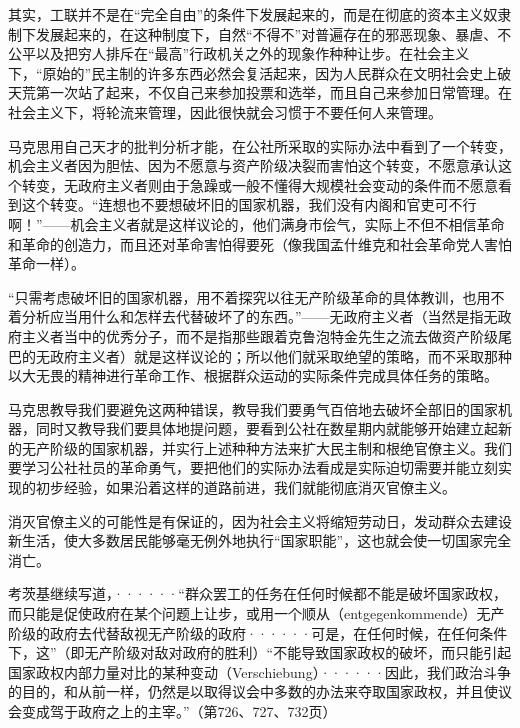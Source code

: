 其实，工联并不是在“完全自由”的条件下发展起来的，而是在{\kaishu 彻底的资本主义奴隶制下}发展起来的，在这种制度下，自然“不得不”对普遍存在的邪恶现象、暴虐、不公平以及把穷人排斥在“最高”行政机关之外的现象作种种让步。在社会主义下，“原始的”民主制的许多东西必然会复活起来，因为人民{\kaishu 群众}在文明社会史上破天荒第一次站了起来，不仅{\kaishu 自己}来参加投票和选举，而且{\kaishu 自己}来参加{\kaishu 日常管理}。在社会主义下，将轮流来管理，因此很快就会习惯于不要任何人来管理。

马克思用自己天才的批判分析才能，在公社所采取的实际办法中看到了一个转变，机会主义者因为胆怯、因为不愿意与资产阶级决裂而害怕这个转变，不愿意承认这个转变，无政府主义者则由于急躁或一般不懂得大规模社会变动的条件而不愿意看到这个转变。“连想也不要想破坏旧的国家机器，我们没有内阁和官吏可不行啊！”——机会主义者就是这样议论的，他们满身市侩气，实际上不但不相信革命和革命的创造力，而且还对革命害怕得要死（像我国孟什维克和社会革命党人害怕革命一样）。

“{\kaishu 只}需考虑破坏旧的国家机器，用不着探究以往无产阶级革命的{\kaishu 具体}教训，也用不着分析应当{\kaishu 用什么}和{\kaishu 怎样}去代替破坏了的东西。”——无政府主义者（当然是指无政府主义者当中的优秀分子，而不是指那些跟着克鲁泡特金先生之流去做资产阶级尾巴的无政府主义者）就是这样议论的；所以他们就采取{\kaishu 绝望的}策略，而不采取那种以大无畏的精神进行革命工作、根据群众运动的实际条件完成具体任务的策略。

马克思教导我们要避免这两种错误，教导我们要勇气百倍地去破坏全部旧的国家机器，同时又教导我们要具体地提问题，要看到公社在数星期内就能够{\kaishu 开始}建立起{\kaishu 新的}无产阶级的国家机器，并实行上述种种方法来扩大民主制和根绝官僚主义。我们要学习公社社员的革命勇气，要把他们的实际办法看成是实际迫切需要并能立刻实现的{\kaishu 初步经验}，如果{\kaishu 沿着这样的道路前进}，我们就能彻底消灭官僚主义。

消灭官僚主义的可能性是有保证的，因为社会主义将缩短劳动日，发动{\kaishu 群众}去建设新生活，使{\kaishu 大多数}居民能够毫无例外地执行“国家职能”，这也就会使一切国家{\kaishu 完全消亡}。

\pskip
\leftskip=10mm
\small

考茨基继续写道，······“群众罢工的任务在任何时候都不能是{\normalsize {\kaishu 破坏}}国家政权，而只能是促使政府在某个问题上让步，或用一个顺从（entgegenkommende）无产阶级的政府去代替敌视无产阶级的政府······\quad 可是，在任何时候，在任何条件下，这”（即无产阶级对敌对政府的胜利）“不能导致国家政权的{\normalsize{\kaishu 破坏}}，而只能引起{\normalsize {\kaishu 国家政权内部}}力量对比的某种{\normalsize {\kaishu 变动}}（Verschiebung）······\quad 因此，我们政治斗争的目的，和从前一样，仍然是以取得议会中多数的办法来夺取国家政权，并且使议会变成驾于政府之上的主宰。”（第726、727、732页）

